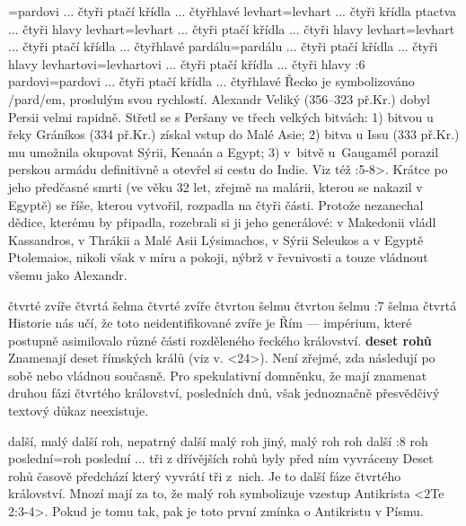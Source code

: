 ={pardovi ... čtyři ptačí křídla ... čtyřhlavé}  %
   {levhart}={levhart ... čtyři křídla ptactva ...  čtyři hlavy}   %
   {levhart}={levhart ... čtyři ptačí křídla ... čtyři hlavy}    %
   {levhart}={levhart ... čtyři ptačí křídla ... čtyřhlavé}    %
   {pardálu}={pardálu ... čtyři ptačí křídla ... čtyři hlavy}    %
   {levhartovi}={levhartovi ... čtyři ptačí křídla ... čtyři hlavy}    %
:6 {pardovi}={pardovi ... čtyři ptačí křídla ... čtyřhlavé}
     Řecko je symbolizováno \x/pard/em, proslulým svou rychlostí.
     Alexandr Veliký (356--323 př.Kr.) dobyl Persii velmi rapidně.
     Střetl se s Peršany ve třech velkých bitvách:
     1) bitvou u řeky Gráníkos (334 př.Kr.) získal vstup do Malé Asie; 
     2) bitva u Issu (333 př.Kr.) mu umožnila okupovat Sýrii, Kenaán a Egypt; 
     3) v~bitvě u~Gaugamél porazil perskou armádu definitivně a otevřel si cestu do Indie.
        Viz též :5-8>. Krátce po jeho předčasné smrti (ve věku 32 let, zřejmě na malárii, kterou se nakazil v Egyptě) se říše, kterou
        vytvořil, rozpadla na čtyři části.  Protože nezanechal dědice, kterému by připadla, rozebrali si ji jeho generálové: v Makedonii vládl Kassandros, v Thrákii a Malé Asii Lýsimachos, v Sýrii Seleukos a v Egyptě Ptolemaios, nikoli však v míru a pokoji, nýbrž v řevnivosti a touze vládnout všemu jako Alexandr.

   {čtvrté zvíře}   %
   {čtvrtá šelma}   %
   {čtvrté zvíře}   %
   {čtvrtou šelmu}   %
   {čtvrtou šelmu}   %
:7 {šelma čtvrtá}
     Historie nás učí, že toto neidentifikované zvíře je Řím --- impérium, které postupně
     asimilovalo různé části rozděleného řeckého království. 
     {\bf deset rohů} Znamenají deset římských králů (viz v. <24>). Není zřejmé, zda následují po      sobě nebo vládnou současně. Pro spekulativní domněnku, že mají znamenat druhou fázi čtvrtého    království,  posledních dnů, však jednoznačně přesvědčivý textový      důkaz neexistuje. 

   {další, malý}   %
   {další roh, nepatrný}   %
   {další malý roh}   %
   {jiný, malý roh}   %
   {roh další}   %
:8 {roh poslední}={roh poslední ... tři z dřívějších rohů byly před ním vyvráceny}
     Deset rohů časově předchází  který vyvrátí tři z~nich. Je to další fáze
     čtvrtého království. Mnozí mají za to, že malý roh symbolizuje vzestup Antikrista 
     <2Te 2:3-4>. Pokud je tomu tak, pak je toto první zmínka o Antikristu v Písmu.  

